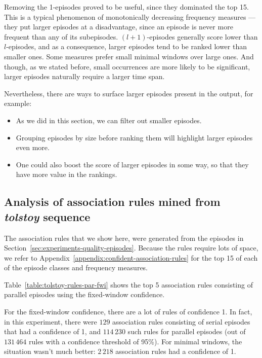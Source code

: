 Removing the 1-episodes proved to be useful, since they dominated the top 15. This is a typical phenomenon of monotonically decreasing frequency measures --- they put larger episodes at a disadvantage, since an episode is never more frequent than any of its subepisodes. $ (l + 1) $-episodes generally score lower than $ l $-episodes, and as a consequence, larger episodes tend to be ranked lower than smaller ones. Some measures prefer small minimal windows over large ones. And though, as we stated before, small occurrences are more likely to be significant, larger episodes naturally require a larger time span.

Nevertheless, there are ways to surface larger episodes present in the output, for example:
\begin{itemize}
\item As we did in this section, we can filter out smaller episodes.
\item Grouping episodes by size before ranking them will highlight larger episodes even more.
\item One could also boost the score of larger episodes in some way, so that they have more value in the rankings.
\end{itemize}



\subsection{Analysis of association rules mined from \emph{tolstoy} sequence}
\label{sec:experiments-quality-rules}


The association rules that we show here, were generated from the episodes in Section~\ref{sec:experiments-quality-episodes}. Because the rules require lots of space, we refer to Appendix~\ref{appendix:confident-association-rules} for the top 15 of each of the episode classes and frequency measures.

Table~\ref{table:tolstoy-rules-par-fwi} shows the top 5 association rules consisting of parallel episodes using the fixed-window confidence.

For the fixed-window confidence, there are a lot of rules of confidence 1. In fact, in this experiment, there were $ 129 $ association rules consisting of serial episodes that had a confidence of 1, and $ 114\,230 $ such rules for parallel episodes (out of $ 131\,464 $ rules with a confidence threshold of 95\%). For minimal windows, the situation wasn't much better: $ 2\,218 $ association rules had a confidence of 1.

